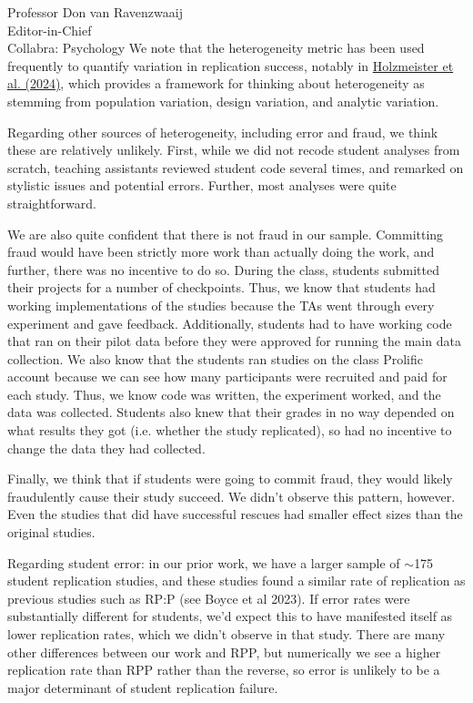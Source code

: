 \documentclass{stanfordletter}
\begin{document}
\begin{letter}{Professor Don van Ravenzwaaij \\ Editor-in-Chief \\ Collabra: Psychology }
	We note that the heterogeneity metric has been used frequently to quantify variation in replication success, notably in \href{doi.org/10.1073/pnas.2403490121}{Holzmeister et al. (2024)}, which provides a framework for thinking about heterogeneity as stemming from population variation, design variation, and analytic variation. 
	
	Regarding other sources of heterogeneity, including error and fraud, we think these are relatively unlikely.  First, while we did not recode student analyses from scratch, teaching assistants reviewed student code several times, and remarked on stylistic issues and potential errors. Further, most analyses were quite straightforward.
	
	We are also quite confident that there is not fraud in our sample. Committing fraud would have been strictly more work than actually doing the work, and further, there was no incentive to do so. During the class, students submitted their projects for a number of checkpoints. Thus, we know that students had working implementations of the studies because the TAs went through every experiment and gave feedback. Additionally, students had to have working code that ran on their pilot data before they were approved for running the main data collection. We also know that the students ran studies on the class Prolific account because we can see how many participants were recruited and paid for each study. Thus, we know code was written, the experiment worked, and the data was collected. Students also knew that their grades in no way depended on what results they got (i.e. whether the study replicated), so had no incentive to change the data they had collected. 
	
Finally, we think that if students were going to commit fraud, they would likely fraudulently cause their study succeed. We didn't observe this pattern, however. Even the studies that did have successful rescues had smaller effect sizes than the original studies. 

Regarding student error: in our prior work, we have a larger sample of $\sim$175 student replication studies, and these studies found a similar rate of replication as previous studies such as RP:P (see Boyce et al 2023). If error rates were substantially different for students, we'd expect this to have manifested itself as lower replication rates, which we didn't observe in that study. There are many other differences between our work and RPP, but numerically we see a higher replication rate than RPP rather than the reverse, so error is unlikely to be a major determinant of student replication failure. 
	

\end{letter}
\end{document}
